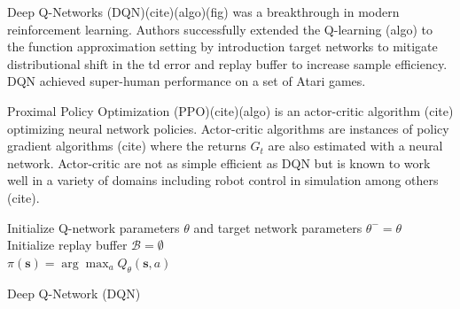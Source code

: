 Deep Q-Networks (DQN)(cite)(algo)(fig) was a breakthrough in modern reinforcement learning. Authors successfully extended the Q-learning (algo) to the function approximation setting by introduction target networks to mitigate distributional shift in the td error and replay buffer to increase sample efficiency.
DQN achieved super-human performance on a set of Atari games.

Proximal Policy Optimization (PPO)(cite)(algo) is an actor-critic algorithm (cite) optimizing neural network policies. 
Actor-critic algorithms are instances of policy gradient algorithms (cite) where the returns $G_t$ are also estimated with a neural network. 
Actor-critic are not as simple efficient as DQN but is known to work well in a variety of domains including robot control in simulation among others (cite).

\begin{algorithm}
    Initialize Q-network parameters $\theta$ and target network parameters $\theta^- = \theta$ \\
    Initialize replay buffer $\mathcal{B} = \emptyset$ \\
    $\pi(\boldsymbol{s}) = \arg\max_a Q_\theta(\boldsymbol{s},a)$ 
    \caption{Deep Q-Network (DQN)}\label{alg:dqn}
\end{algorithm}


